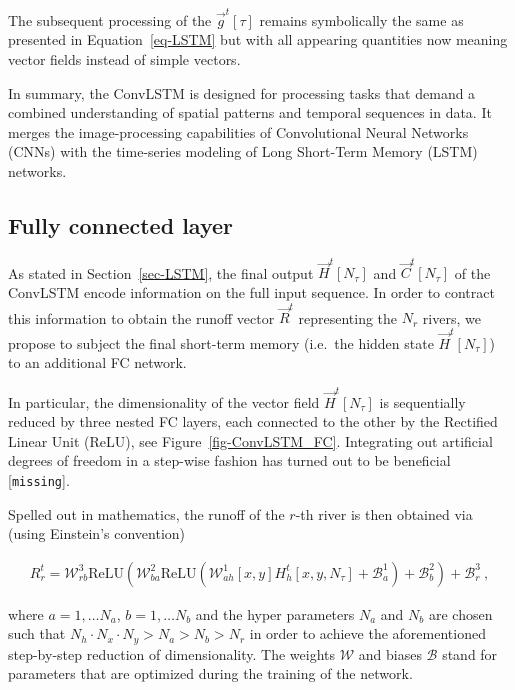 \documentclass[
]{agujournal2019}
\begin{document}
The subsequent processing of the \(\vec{g}^t[\tau]\) remains
symbolically the same as presented in Equation~\ref{eq-LSTM} but with
all appearing quantities now meaning vector fields instead of simple
vectors.

In summary, the ConvLSTM is designed for processing tasks that demand a
combined understanding of spatial patterns and temporal sequences in
data. It merges the image-processing capabilities of Convolutional
Neural Networks (CNNs) with the time-series modeling of Long Short-Term
Memory (LSTM) networks.

\subsection{Fully connected layer}\label{sec-FC_layer}

As stated in Section~\ref{sec-LSTM}, the final output
\(\vec{H}^t[N_\tau]\) and \(\vec{C}^t[N_\tau]\) of the ConvLSTM encode
information on the full input sequence. In order to contract this
information to obtain the runoff vector \(\vec{R}^t\) representing the
\(N_r\) rivers, we propose to subject the final short-term memory
(i.e.~the hidden state \(\vec{H}^t[N_\tau]\)) to an additional FC
network.

In particular, the dimensionality of the vector field
\(\vec{H}^t[N_\tau]\) is sequentially reduced by three nested FC layers,
each connected to the other by the Rectified Linear Unit (ReLU), see
Figure~\ref{fig-ConvLSTM_FC}. Integrating out artificial degrees of
freedom in a step-wise fashion has turned out to be beneficial
{[}\texttt{missing}{]}.

Spelled out in mathematics, the runoff of the \(r\)-th river is then
obtained via (using Einstein's convention)

\[
\begin{aligned}
R_r^t = \mathcal{W}^{3}_{rb}\mathrm{ReLU}\left(\mathcal{W}^{2}_{ba}\mathrm{ReLU}\left(\mathcal{W}^{1}_{ah} [x,y] H^t_h[x,y, N_\tau] + \mathcal{B}^1_a\right) + \mathcal{B}^2_b \right) + \mathcal{B}^3_r \ ,
\end{aligned} 
\]

where \(a=1,\ldots N_a\), \(b=1,\ldots N_b\) and the hyper parameters
\(N_a\) and \(N_b\) are chosen such that
\(N_h\cdot N_x\cdot N_y > N_a > N_b > N_r\) in order to achieve the
aforementioned step-by-step reduction of dimensionality. The weights
\(\mathcal{W}\) and biases \(\mathcal{B}\) stand for parameters that are
optimized during the training of the network.
\end{document}
